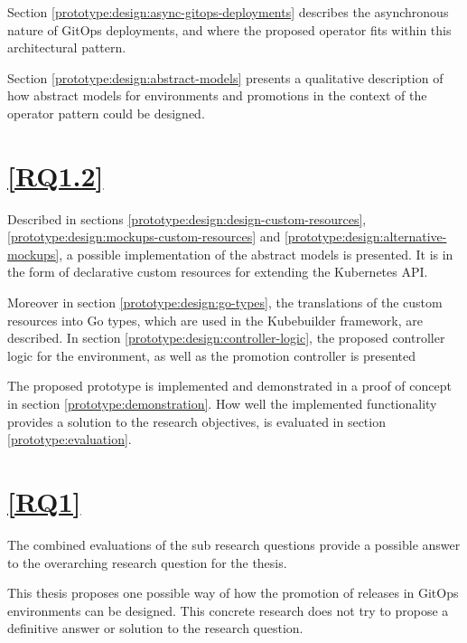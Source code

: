Section \ref{prototype:design:async-gitops-deployments} describes the asynchronous nature of
GitOps deployments, and where the proposed operator fits within this architectural pattern.

Section \ref{prototype:design:abstract-models} presents a qualitative description 
of how abstract models for environments and promotions in the context of the operator pattern
could be designed.

\section*{\ref{RQ1.2}}

Described in sections \ref{prototype:design:design-custom-resources}, \ref{prototype:design:mockups-custom-resources} and \ref{prototype:design:alternative-mockups},
a possible implementation of the abstract models is presented.
It is in the form of declarative custom resources for extending the Kubernetes API.

Moreover in section \ref{prototype:design:go-types},
the translations of the custom resources into Go types, which are used in the Kubebuilder framework,
are described.
In section \ref{prototype:design:controller-logic},
the proposed controller logic for the environment, as well as the promotion controller is presented

The proposed prototype is implemented and demonstrated in a proof of concept in section
\ref{prototype:demonstration}.
How well the implemented functionality provides a solution to the research objectives,
is evaluated in section \ref{prototype:evaluation}.

\section*{\ref{RQ1}}

The combined evaluations of the sub research questions provide a possible answer to the
overarching research question for the thesis.

This thesis proposes one possible way of how
the promotion of releases in GitOps environments can be designed.
This concrete research does not try to
propose a definitive answer or solution to the research question.





































